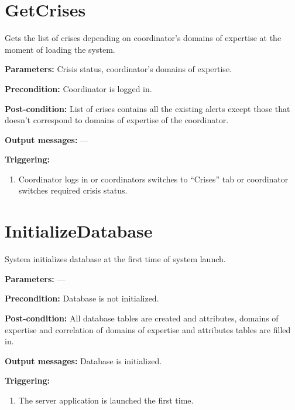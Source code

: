 \section{GetCrises}
\label{operation:GetCrises}
Gets the list of crises depending on coordinator’s domains of expertise at the
moment of loading the system.

\begin{description}

\item \textbf{Parameters:} Crisis status, coordinator’s domains of
expertise.
\item \textbf{Precondition:} Coordinator is logged in.
\item \textbf{Post-condition:} List of crises contains all the existing alerts
except those that doesn’t correspond to domains of expertise of the coordinator.

\item \textbf{Output messages:} ---

\item \textbf{Triggering:}
\begin{enumerate}
\item Coordinator logs in or coordinators switches to ``Crises'' tab or
coordinator switches required crisis status.
\end{enumerate}
 
\end{description}

\section{InitializeDatabase}
\label{operation:InitializeDatabase}
System initializes database at the first time of system launch.

\begin{description}

\item \textbf{Parameters:} ---
\item \textbf{Precondition:} Database is not initialized.
\item \textbf{Post-condition:} All database tables are created and attributes,
domains of expertise and correlation of domains of expertise and attributes
tables are filled in.

\item \textbf{Output messages:} Database is initialized.

\item \textbf{Triggering:}
\begin{enumerate}
\item The server application is launched the first time.
\end{enumerate}
 
\end{description}